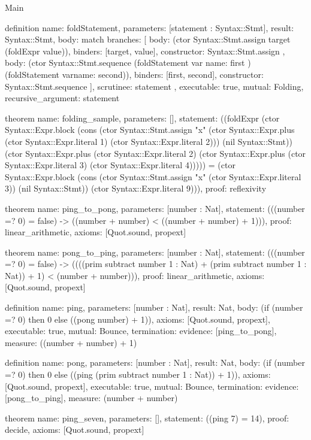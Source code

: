 \begin{lexlean}{Main}
\begin{semanticmodule}
definition{
  name: foldStatement,
  parameters: [statement : Syntax::Stmt],
  result: Syntax::Stmt,
  body: match{
    branches: [
      {
        body: (ctor Syntax::Stmt.assign target (foldExpr value)),
        binders: [target, value],
        constructor: Syntax::Stmt.assign
      },
      {
        body: (ctor Syntax::Stmt.sequence (foldStatement var{
          name: first
        }) (foldStatement var{name: second})),
        binders: [first, second],
        constructor: Syntax::Stmt.sequence
      }
    ],
    scrutinee: statement
  },
  executable: true,
  mutual: Folding,
  recursive_argument: statement
}

theorem{
  name: folding_sample,
  parameters: [],
  statement: ((foldExpr (ctor Syntax::Expr.block (cons (ctor Syntax::Stmt.assign "x" (ctor Syntax::Expr.plus (ctor Syntax::Expr.literal 1) (ctor Syntax::Expr.literal 2))) (nil Syntax::Stmt)) (ctor Syntax::Expr.plus (ctor Syntax::Expr.literal 2) (ctor Syntax::Expr.plus (ctor Syntax::Expr.literal 3) (ctor Syntax::Expr.literal 4))))) = (ctor Syntax::Expr.block (cons (ctor Syntax::Stmt.assign "x" (ctor Syntax::Expr.literal 3)) (nil Syntax::Stmt)) (ctor Syntax::Expr.literal 9))),
  proof: reflexivity{}
}

theorem{
  name: ping_to_pong,
  parameters: [number : Nat],
  statement: (((number =? 0) = false) -> ((number + number) < ((number + number) + 1))),
  proof: linear_arithmetic{},
  axioms: [Quot.sound, propext]
}

theorem{
  name: pong_to_ping,
  parameters: [number : Nat],
  statement: (((number =? 0) = false) -> ((((prim subtract number 1 : Nat) + (prim subtract number 1 : Nat)) + 1) < (number + number))),
  proof: linear_arithmetic{},
  axioms: [Quot.sound, propext]
}

definition{
  name: ping,
  parameters: [number : Nat],
  result: Nat,
  body: (if (number =? 0) then 0 else ((pong number) + 1)),
  axioms: [Quot.sound, propext],
  executable: true,
  mutual: Bounce,
  termination: {evidence: [ping_to_pong], measure: ((number + number) + 1)}
}

definition{
  name: pong,
  parameters: [number : Nat],
  result: Nat,
  body: (if (number =? 0) then 0 else ((ping (prim subtract number 1 : Nat)) + 1)),
  axioms: [Quot.sound, propext],
  executable: true,
  mutual: Bounce,
  termination: {evidence: [pong_to_ping], measure: (number + number)}
}

theorem{
  name: ping_seven,
  parameters: [],
  statement: ((ping 7) = 14),
  proof: decide{},
  axioms: [Quot.sound, propext]
}
\end{semanticmodule}
\end{lexlean}
